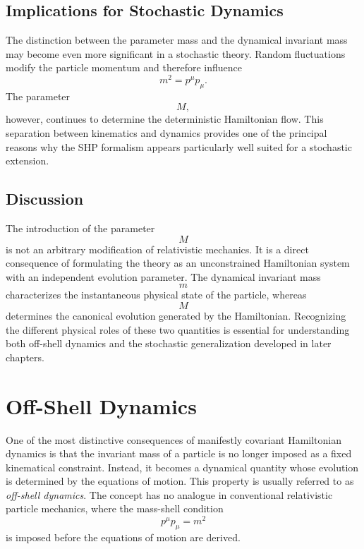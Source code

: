 \subsection{Implications for Stochastic Dynamics}
The distinction between the parameter mass and the dynamical invariant
mass may become even more significant in a stochastic theory.
Random fluctuations modify the particle momentum and therefore influence
\[m^2=p^\mu p_\mu.\]
The parameter
\[M,\]
however, continues to determine the deterministic Hamiltonian flow.
This separation between kinematics and dynamics provides one of the
principal reasons why the SHP formalism appears particularly well suited
for a stochastic extension.
\subsection{Discussion}
The introduction of the parameter
\[M\]
is not an arbitrary modification of relativistic mechanics.
It is a direct consequence of formulating the theory as an unconstrained
Hamiltonian system with an independent evolution parameter.
The dynamical invariant mass
\[m\]
characterizes the instantaneous physical state of the particle, whereas
\[M\]
determines the canonical evolution generated by the Hamiltonian.
Recognizing the different physical roles of these two quantities is
essential for understanding both off-shell dynamics and the stochastic
generalization developed in later chapters.
\section{Off-Shell Dynamics}
One of the most distinctive consequences of manifestly covariant
Hamiltonian dynamics is that the invariant mass of a particle is no
longer imposed as a fixed kinematical constraint. Instead, it becomes a
dynamical quantity whose evolution is determined by the equations of
motion.
This property is usually referred to as \emph{off-shell dynamics}.
The concept has no analogue in conventional relativistic particle
mechanics, where the mass-shell condition
\[p^\mu p_\mu = m^2\]
is imposed before the equations of motion are derived.
